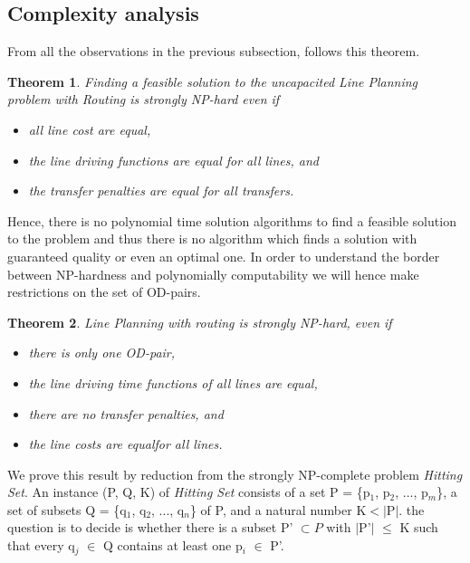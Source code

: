 \documentclass[
  twoside,
  11pt, a4paper,
  footinclude=true,
  headinclude=true,
  cleardoublepage=empty
]{scrbook}
\newtheorem{theorem}{Theorem}[section]
\theoremstyle{definition}
\begin{document}
\subsection{Complexity analysis}
From all the observations in the previous subsection, follows this theorem.
\begin{theorem} Finding a feasible solution to the uncapacited Line Planning problem with Routing is strongly NP-hard even if
\begin{itemize} 
\item all line cost are equal,
\item the line driving functions are equal for all lines, and
\item the transfer penalties are equal for all transfers.
\end{itemize}
\end{theorem}
Hence, there is no polynomial time solution algorithms to find a feasible solution to the problem and thus there is no algorithm which finds a solution with guaranteed quality or even an optimal one. \newline
In order to understand the border between NP-hardness and polynomially computability we will hence make restrictions on the set of OD-pairs.
\begin{theorem} Line Planning with routing is strongly NP-hard, even if
\begin{itemize} 
\item there is only one OD-pair,
\item the line driving time functions of all lines are equal,
\item there are no transfer penalties, and
\item the line costs are equalfor all lines.
\end{itemize}
\end{theorem}
We prove this result by reduction from the strongly NP-complete problem \emph{Hitting Set}. \newline
An instance (P, Q, K) of \emph{Hitting Set} consists of a set P = \{p$_1$, p$_2$, ..., p$_m$\}, a set of subsets Q = \{q$_1$, q$_2$, ..., q$_n$\} of P, and a natural number K$<|$P$|$. the question is to decide is whether there is a subset P' $\subset P$ with $|$P'$|$ $\le$ K such that every q$_j$ $\in$ Q contains at least one p$_i$ $\in$ P'.
\end{document}
